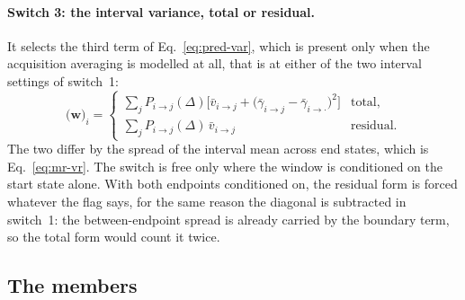 \begin{appendixbox}
\paragraph{Switch 3: the interval variance, total or residual.} It selects the third term of
Eq.~\ref{eq:pred-var}, which is present only when the acquisition averaging is modelled at
all, that is at either of the two interval settings of switch~1:
\begin{equation}
  \bigl(\mathbf{w}\bigr)_{i} =
  \begin{cases}
    \sum_{j} P_{i\to j}(\Delta)\bigl[\bar{v}_{i\to j}
      + \bigl(\bar{\gamma}_{i\to j}-\bar{\gamma}_{i\to\cdot}\bigr)^2\bigr]
      & \text{total,}\\[4pt]
    \sum_{j} P_{i\to j}(\Delta)\,\bar{v}_{i\to j}
      & \text{residual.}
  \end{cases}
  \label{eq:variance-form}
\end{equation}
The two differ by the spread of the interval mean across end states, which is
Eq.~\ref{eq:mr-vr}. The switch is free only where the window is conditioned on the start
state alone. With both endpoints conditioned on, the
residual form is forced whatever the flag says, for the same reason the diagonal is
subtracted in switch~1: the between-endpoint spread is already carried by the boundary term,
so the total form would count it twice. %

\subsection*{The members}


\end{appendixbox}
